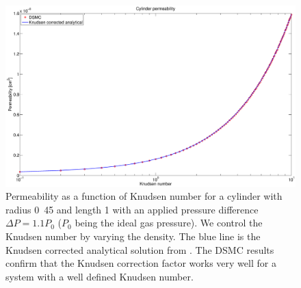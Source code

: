 \begin{figure}[h]
\begin{center}
\includegraphics[width=\textwidth, trim=0cm 0cm 0cm 0cm, clip]{DSMC/figures/cylinder_knudsen_permeability.eps}
\end{center}
\caption{Permeability as a function of Knudsen number for a cylinder with radius \unit{0.45}{\micro\meter} and length \unit{1}{\micro\meter} with an applied pressure difference $\Delta P = 1.1P_0$ ($P_0$ being the ideal gas pressure). We control the Knudsen number by varying the density. The blue line is the Knudsen corrected analytical solution from \cite{karniadakis2005microflows}. The DSMC results confirm that the Knudsen correction factor works very well for a system with a well defined Knudsen number.}
\label{fig:one_cylinder_varying_knudsen}
\end{figure}

